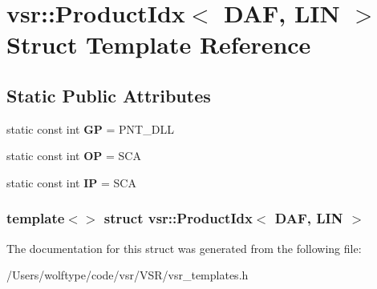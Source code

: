 \hypertarget{structvsr_1_1_product_idx_3_01_d_a_f_00_01_l_i_n_01_4}{\section{vsr\-:\-:Product\-Idx$<$ D\-A\-F, L\-I\-N $>$ Struct Template Reference}
\label{structvsr_1_1_product_idx_3_01_d_a_f_00_01_l_i_n_01_4}
}
\subsection*{Static Public Attributes}
\begin{DoxyCompactItemize}
\item 
\hypertarget{structvsr_1_1_product_idx_3_01_d_a_f_00_01_l_i_n_01_4_aaf54a52dada54f4956a17d093232eb23}{static const int {\bfseries G\-P} = P\-N\-T\-\_\-\-D\-L\-L}\label{structvsr_1_1_product_idx_3_01_d_a_f_00_01_l_i_n_01_4_aaf54a52dada54f4956a17d093232eb23}

\item 
\hypertarget{structvsr_1_1_product_idx_3_01_d_a_f_00_01_l_i_n_01_4_a94a984f5a921b5195b48ab32b1f9f485}{static const int {\bfseries O\-P} = S\-C\-A}\label{structvsr_1_1_product_idx_3_01_d_a_f_00_01_l_i_n_01_4_a94a984f5a921b5195b48ab32b1f9f485}

\item 
\hypertarget{structvsr_1_1_product_idx_3_01_d_a_f_00_01_l_i_n_01_4_a70698510e6e23648f94c6e1651d6955f}{static const int {\bfseries I\-P} = S\-C\-A}\label{structvsr_1_1_product_idx_3_01_d_a_f_00_01_l_i_n_01_4_a70698510e6e23648f94c6e1651d6955f}

\end{DoxyCompactItemize}
\subsubsection*{template$<$$>$ struct vsr\-::\-Product\-Idx$<$ D\-A\-F, L\-I\-N $>$}



The documentation for this struct was generated from the following file\-:\begin{DoxyCompactItemize}
\item 
/\-Users/wolftype/code/vsr/\-V\-S\-R/vsr\-\_\-templates.\-h\end{DoxyCompactItemize}
